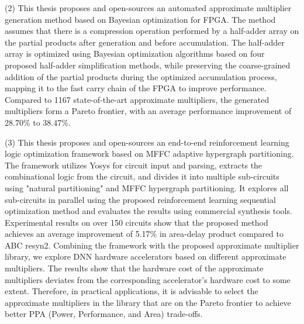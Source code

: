 \begin{abstract*}
      (2) This thesis proposes and open-sources an automated approximate multiplier generation method based on Bayesian optimization for FPGA. The method assumes that there is a compression operation performed by a half-adder array on the partial products after generation and before accumulation. The half-adder array is optimized using Bayesian optimization algorithms based on four proposed half-adder simplification methods, while preserving the coarse-grained addition of the partial products during the optimized accumulation process, mapping it to the fast carry chain of the FPGA to improve performance. Compared to 1167 state-of-the-art approximate multipliers, the generated multipliers form a Pareto frontier, with an average performance improvement of 28.70\% to 38.47\%.
    
      (3) This thesis proposes and open-sources an end-to-end reinforcement learning logic optimization framework based on MFFC adaptive hypergraph partitioning. The framework utilizes Yosys for circuit input and parsing, extracts the combinational logic from the circuit, and divides it into multiple sub-circuits using "natural partitioning" and MFFC hypergraph partitioning. It explores all sub-circuits in parallel using the proposed reinforcement learning sequential optimization method and evaluates the results using commercial synthesis tools. Experimental results on over 150 circuits show that the proposed method achieves an average improvement of 5.17\% in area-delay product compared to ABC resyn2. Combining the framework with the proposed approximate multiplier library, we explore DNN hardware accelerators based on different approximate multipliers. The results show that the hardware cost of the approximate multipliers deviates from the corresponding accelerator's hardware cost to some extent. Therefore, in practical applications, it is advisable to select the approximate multipliers in the library that are on the Pareto frontier to achieve better PPA (Power, Performance, and Area) trade-offs.
\end{abstract*}